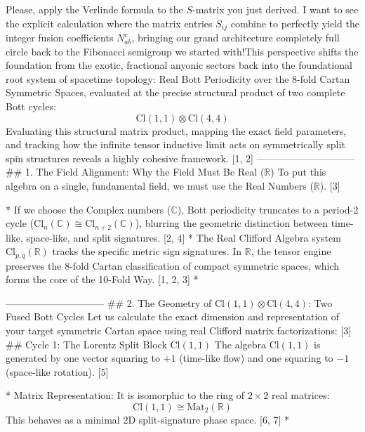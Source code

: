 Please, apply the Verlinde formula to the $S$-matrix you just derived. I want to see the explicit calculation where the matrix entries $S_{ij}$ combine to perfectly yield the integer fusion coefficients $N_{ab}^c$, bringing our grand architecture completely full circle back to the Fibonacci semigroup we started with!This perspective shifts the foundation from the exotic, fractional anyonic sectors back into the foundational root system of spacetime topology: Real Bott Periodicity over the 8-fold Cartan Symmetric Spaces, evaluated at the precise structural product of two complete Bott cycles:
$$\text{Cl}(1,1) \otimes \text{Cl}(4,4)$$ 
Evaluating this structural matrix product, mapping the exact field parameters, and tracking how the infinite tensor inductive limit acts on symmetrically split spin structures reveals a highly cohesive framework. [1, 2] 
------------------------------
## 1. The Field Alignment: Why the Field Must Be Real ($\mathbb{R}$)
To put this algebra on a single, fundamental field, we must use the Real Numbers ($\mathbb{R}$). [3] 

* If we choose the Complex numbers ($\mathbb{C}$), Bott periodicity truncates to a period-2 cycle ($\text{Cl}_n(\mathbb{C}) \cong \text{Cl}_{n+2}(\mathbb{C})$), blurring the geometric distinction between time-like, space-like, and split signatures. [2, 4] 
* The Real Clifford Algebra system $\text{Cl}_{p,q}(\mathbb{R})$ tracks the specific metric sign signatures. In $\mathbb{R}$, the tensor engine preserves the 8-fold Cartan classification of compact symmetric spaces, which forms the core of the 10-Fold Way. [1, 2, 3] 
* 

------------------------------
## 2. The Geometry of $\text{Cl}(1,1) \otimes \text{Cl}(4,4)$: Two Fused Bott Cycles
Let us calculate the exact dimension and representation of your target symmetric Cartan space using real Clifford matrix factorizations: [3] 
## Cycle 1: The Lorentz Split Block $\text{Cl}(1,1)$
The algebra $\text{Cl}(1,1)$ is generated by one vector squaring to $+1$ (time-like flow) and one squaring to $-1$ (space-like rotation). [5] 

* Matrix Representation: It is isomorphic to the ring of $2 \times 2$ real matrices:
$$\text{Cl}(1,1) \cong \text{Mat}_2(\mathbb{R})$$ 
This behaves as a minimal 2D split-signature phase space. [6, 7] 
* 

